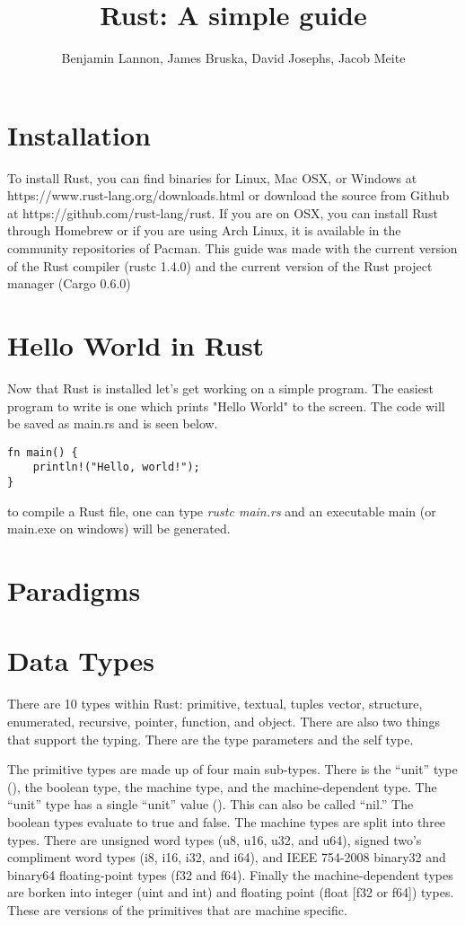 \documentclass{article}
\title{Rust: A simple guide}
\author{Benjamin Lannon, James Bruska, David Josephs, Jacob Meite}
\begin{document}
\maketitle
\tableofcontents

\section{Installation}
To install Rust, you can find binaries for Linux, Mac OSX, or Windows at https://www.rust-lang.org/downloads.html or download the source from Github at https://github.com/rust-lang/rust. If you are on OSX, you can install Rust through Homebrew or if you are using Arch Linux, it is available in the community repositories of Pacman. This guide was made with the current version of the Rust compiler (rustc 1.4.0) and the current version of the Rust project manager (Cargo 0.6.0)

\section{Hello World in Rust}
Now that Rust is installed let's get working on a simple program. The easiest program to write is one which prints "Hello World" to the screen. The code will be saved as main.rs and is seen below.
\begin{lstlisting}
fn main() {
	println!("Hello, world!");
}
\end{lstlisting}

to compile a Rust file, one can type \emph{rustc main.rs} and an executable main (or main.exe on windows) will be generated.

\section{Paradigms}

\section{Data Types}
There are 10 types within Rust: primitive, textual, tuples vector, structure, enumerated, recursive, pointer, function, and object. There are also two things that support the typing. There are the type parameters and the self type.

The primitive types are made up of four main sub-types. There is the “unit” type (), the boolean type, the machine type, and the machine-dependent type. The “unit” type has a single “unit” value (). This can also be called “nil.” The boolean types evaluate to true and false. The machine types are split into three types. There are unsigned word types (u8, u16, u32, and u64), signed two's compliment word types (i8, i16, i32, and i64), and IEEE 754-2008 binary32 and binary64 floating-point types (f32 and f64). Finally the machine-dependent types are borken into integer (uint and int) and floating point (float [f32 or f64]) types. These are versions of the primitives that are machine specific. 
\end{document}
